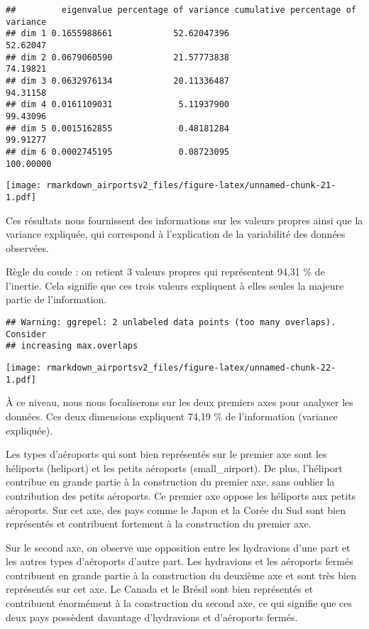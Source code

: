\documentclass[
]{compterendu}
\begin{document}
\begin{verbatim}
##         eigenvalue percentage of variance cumulative percentage of variance
## dim 1 0.1655988661            52.62047396                          52.62047
## dim 2 0.0679060590            21.57773838                          74.19821
## dim 3 0.0632976134            20.11336487                          94.31158
## dim 4 0.0161109031             5.11937900                          99.43096
## dim 5 0.0015162855             0.48181284                          99.91277
## dim 6 0.0002745195             0.08723095                         100.00000
\end{verbatim}

\texttt{[image: rmarkdown\_airportsv2\_files/figure-latex/unnamed-chunk-21-1.pdf]}

Ces résultats nous fournissent des informations sur les valeurs propres
ainsi que la variance expliquée, qui correspond à l'explication de la
variabilité des données observées.

Règle du coude : on retient 3 valeurs propres qui représentent 94,31 \%
de l'inertie. Cela signifie que ces trois valeurs expliquent à elles
seules la majeure partie de l'information.

\begin{verbatim}
## Warning: ggrepel: 2 unlabeled data points (too many overlaps). Consider
## increasing max.overlaps
\end{verbatim}

\texttt{[image: rmarkdown\_airportsv2\_files/figure-latex/unnamed-chunk-22-1.pdf]}

À ce niveau, nous nous focaliserons sur les deux premiers axes pour
analyser les données. Ces deux dimensions expliquent 74,19 \% de
l'information (variance expliquée).

Les types d'aéroports qui sont bien représentés sur le premier axe sont
les héliports (heliport) et les petits aéroports (small\_airport). De
plus, l'héliport contribue en grande partie à la construction du premier
axe, sans oublier la contribution des petits aéroports. Ce premier axe
oppose les héliports aux petits aéroports. Sur cet axe, des pays comme
le Japon et la Corée du Sud sont bien représentés et contribuent
fortement à la construction du premier axe.

Sur le second axe, on observe une opposition entre les hydravions d'une
part et les autres types d'aéroports d'autre part. Les hydravions et les
aéroports fermés contribuent en grande partie à la construction du
deuxième axe et sont très bien représentés sur cet axe. Le Canada et le
Brésil sont bien représentés et contribuent énormément à la construction
du second axe, ce qui signifie que ces deux pays possèdent davantage
d'hydravions et d'aéroports fermés.
\end{document}
